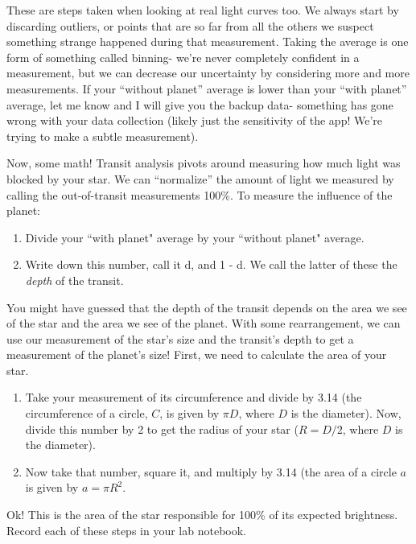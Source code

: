 \documentclass[11pt]{article}
\begin{document}
\noindent
These are steps taken when looking at real light curves too. We always start by discarding outliers, or points that are so far from all the others we suspect something strange happened during that measurement. Taking the average is one form of something called binning- we’re never completely confident in a measurement, but we can decrease our uncertainty by considering more and more measurements. If your “without planet” average is lower than your “with planet” average, let me know and I will give you the backup data- something has gone wrong with your data collection (likely just the sensitivity of the app! We’re trying to make a subtle measurement). 

\medskip \noindent
Now, some math! Transit analysis pivots around measuring how much light was blocked by your star. We can “normalize” the amount of light we measured by calling the out-of-transit measurements 100\%. To measure the influence of the planet:
\begin{enumerate}[resume]
    \item Divide your ``with planet" average by your ``without planet" average.
    \item  Write down this number, call it d, and 1 - d. We call the latter of these the \textit{depth} of the transit.
\end{enumerate}

\noindent
You might have guessed that the depth of the transit depends on the area we see of the star and the area we see of the planet. With some rearrangement, we can use our measurement of the star’s size and the transit’s depth to get a measurement of the planet’s size! First, we need to calculate the area of your star.

\begin{enumerate}[resume]
    \item Take your measurement of its circumference and divide by 3.14 (the circumference of a circle, $C$, is given by $\pi D$, where $D$ is the diameter). Now, divide this number by 2 to get the radius of your star ($R = D/2$, where $D$ is the diameter).
    \item Now take that number, square it, and multiply by 3.14 (the area of a circle $a$ is given by $a = \pi R^2$.
\end{enumerate}

\noindent
Ok! This is the area of the star responsible for 100\% of its expected brightness. Record each of these steps in your lab notebook.
\end{document}
